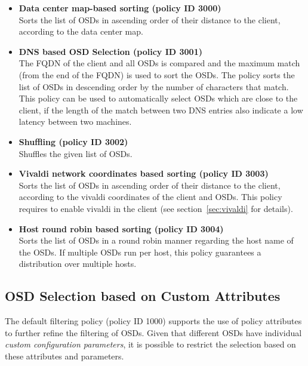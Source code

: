 \documentclass[a4paper,10pt]{book}
\begin{document}
\begin{itemize}

 \item \textbf{Data center map-based sorting (policy ID 3000)}\\
 Sorts the list of OSDs in ascending order of their distance to the client, according to the data center map.

 \item \textbf{DNS based OSD Selection (policy ID 3001)}\\
 The FQDN of the client and all OSDs is compared and the maximum match (from the end of the FQDN) is used to sort the OSDs. The policy sorts the list of OSDs in descending order by the number of characters that match. This policy can be used to automatically select OSDs which are close to the client, if the length of the match between two DNS entries also indicate a low latency between two machines.

 \item \textbf{Shuffling (policy ID 3002)}\\
 Shuffles the given list of OSDs.

 \item \textbf{Vivaldi network coordinates based sorting (policy ID 3003)}\\
 Sorts the list of OSDs in ascending order of their distance to the client, according to the vivaldi coordinates of the client and OSDs. This policy requires to enable vivaldi in the client (see section~\ref{sec:vivaldi} for details).
 
 \item \textbf{Host round robin based sorting (policy ID 3004)}\\
 Sorts the list of OSDs in a round robin manner regarding the host name of the OSDs. If multiple OSDs run per host, this policy guarantees a distribution over multiple hosts.

\end{itemize}

\subsection{OSD Selection based on Custom Attributes}
\label{sec:custom_osd_selection}
The default filtering policy (policy ID 1000) supports the use of policy attributes to further refine the filtering of OSDs. Given that different OSDs have individual \emph{custom configuration parameters}, it is possible to restrict the selection based on these attributes and parameters.
\end{document}
